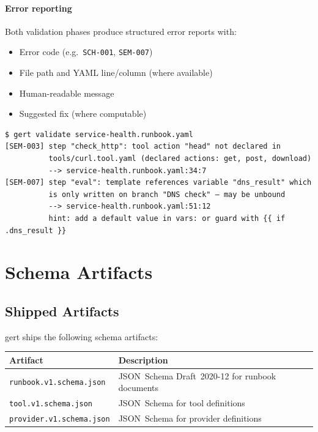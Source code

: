 \paragraph{Error reporting}

Both validation phases produce structured error reports with:
\begin{itemize}
  \item Error code (e.g.\ \texttt{SCH-001}, \texttt{SEM-007})
  \item File path and YAML line/column (where available)
  \item Human-readable message
  \item Suggested fix (where computable)
\end{itemize}

\begin{verbatim}
$ gert validate service-health.runbook.yaml
[SEM-003] step "check_http": tool action "head" not declared in
          tools/curl.tool.yaml (declared actions: get, post, download)
          --> service-health.runbook.yaml:34:7
[SEM-007] step "eval": template references variable "dns_result" which
          is only written on branch "DNS check" — may be unbound
          --> service-health.runbook.yaml:51:12
          hint: add a default value in vars: or guard with {{ if .dns_result }}
\end{verbatim}

\section{Schema Artifacts}
\label{sec:schema-artifacts}

\subsection{Shipped Artifacts}

gert ships the following schema artifacts:

\begin{center}
\begin{tabular}{lp{9cm}}
\hline
\textbf{Artifact} & \textbf{Description} \\
\hline
\texttt{runbook.v1.schema.json}   & JSON~Schema Draft~2020-12 for runbook documents \\
\texttt{tool.v1.schema.json}      & JSON~Schema for tool definitions \\
\texttt{provider.v1.schema.json}  & JSON~Schema for provider definitions \\
\hline
\end{tabular}
\end{center}

